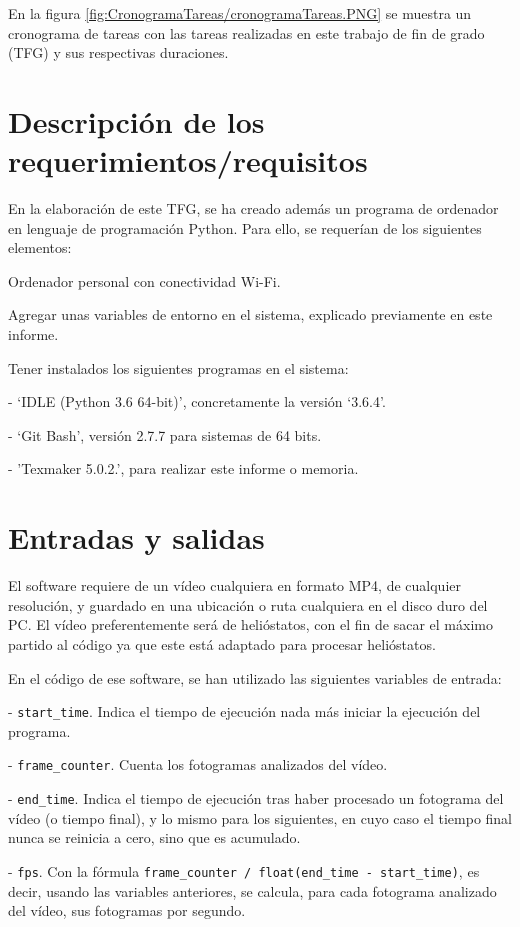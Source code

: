 En la figura \ref{fig:CronogramaTareas/cronogramaTareas.PNG} se muestra un cronograma de tareas con las tareas realizadas en este trabajo de fin de grado (TFG) y sus respectivas duraciones.

\section{Descripción de los requerimientos/requisitos}

En la elaboración de este TFG, se ha creado además un programa de ordenador en lenguaje de programación Python. Para ello, se requerían de los siguientes elementos:

Ordenador personal con conectividad Wi-Fi.

Agregar unas variables de entorno en el sistema, explicado previamente en este informe.

Tener instalados los siguientes programas en el sistema:

- ‘IDLE (Python 3.6 64-bit)’, concretamente la versión ‘3.6.4’.

- ‘Git Bash’, versión 2.7.7 para sistemas de 64 bits.

- 'Texmaker 5.0.2.', para realizar este informe o memoria.

\section{Entradas y salidas}

El software requiere de un vídeo cualquiera en formato MP4, de cualquier resolución, y guardado en una ubicación o ruta cualquiera en el disco duro del PC. El vídeo preferentemente será de helióstatos, con el fin de sacar el máximo partido al código ya que este está adaptado para procesar helióstatos.

En el código de ese software, se han utilizado las siguientes variables de entrada:

- \verb|start_time|. Indica el tiempo de ejecución nada más iniciar la ejecución del programa.

- \verb|frame_counter|. Cuenta los fotogramas analizados del vídeo.

- \verb|end_time|. Indica el tiempo de ejecución tras haber procesado un fotograma del vídeo (o tiempo final), y lo mismo para los siguientes, en cuyo caso el tiempo final nunca se reinicia a cero, sino que es acumulado.

- \verb|fps|. Con la fórmula \verb|frame_counter / float(end_time - start_time)|, es decir, usando las variables anteriores, se calcula, para cada fotograma analizado del vídeo, sus fotogramas por segundo.

